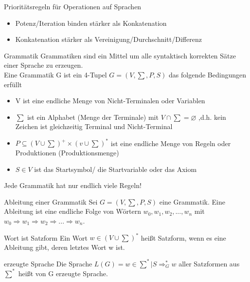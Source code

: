 \documentclass[avery5371]{flashcards}
\begin{document}
\begin{flashcard}[Definition]{Prioritätsregeln für Operationen auf Sprachen}
    \begin{itemize}
        \item Potenz/Iteration binden stärker als Konkatenation
        \item Konkatenation stärker als Vereinigung/Durchschnitt/Differenz
    \end{itemize}
\end{flashcard}
    
\begin{flashcard}[Definition]{Grammatik}\scriptsize
Grammatiken sind ein Mittel um alle syntaktisch korrekten Sätze einer Sprache zu erzeugen.\\
Eine Grammatik G ist ein 4-Tupel $G=(V, \sum, P, S)$ das folgende Bedingungen erfüllt
\begin{itemize}
    \item V ist eine endliche Menge von Nicht-Terminalen oder Variablen
    \item $\sum$ ist ein Alphabet (Menge der Terminale) mit 
    $V\cap \sum = \varnothing$
    ,d.h. kein Zeichen ist gleichzeitig Terminal und Nicht-Terminal
    \item $P\subseteq (V\cup \sum)^+ \times (v\cup\sum)^*$ ist eine endliche Menge von Regeln oder Produktionen (Produktionsmenge)
    \item $S\in V$ ist das Startsymbol/ die Startvariable oder das Axiom
\end{itemize}

Jede Grammatik hat nur endlich viele Regeln!
\end{flashcard}

\begin{flashcard}[Definition]{Ableitung einer Grammatik}
Sei $G=(V, \sum, P, S)$  eine Grammatik. Eine Ableitung ist eine endliche Folge von Wörtern $w_0, w_1, w_2,...,w_n$ mit $w_0\Rightarrow w_1 \Rightarrow w_2 \Rightarrow ... \Rightarrow w_n$.
\end{flashcard}

\begin{flashcard}[Definition]{Wort ist Satzform}
Ein Wort $w\in (V\cup\sum)^*$ heißt Satzform, wenn es eine Ableitung gibt, deren letztes Wort w ist.
\end{flashcard}

\begin{flashcard}[Definition]{erzeugte Sprache}
Die Sprache $L(G)={w\in \sum^* | S\Rightarrow_G^* w}$ aller Satzformen aus $\sum^*$ heißt von G erzeugte Sprache.
\end{flashcard}
\end{document}
